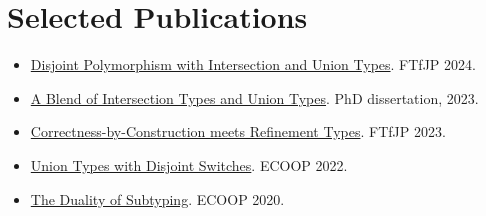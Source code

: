 \section{Selected Publications}
\begin{itemize}[nosep,after=\strut, leftmargin=1em, itemsep=3pt]
    \item[--] \href{https://baberrehman.github.io/files/FTFJP24.pdf}{Disjoint Polymorphism with Intersection and Union Types}. FTfJP 2024.
    \item[--] \href{https://baberrehman.github.io/files/baber_thesis.pdf}{A Blend of Intersection Types and Union Types}. PhD dissertation, 2023.
    \item[--] \href{https://conf.researchr.org/track/ecoop-issta-2023/FTfJP-2023}{Correctness-by-Construction meets Refinement Types}. FTfJP 2023.
    \item[--] \href{https://doi.org/10.4230/LIPIcs.ECOOP.2022.25}{Union Types with Disjoint Switches}. ECOOP 2022.
    \item[--] \href{https://doi.org/10.4230/LIPIcs.ECOOP.2020.29}{The Duality of Subtyping}. ECOOP 2020.
\end{itemize}
